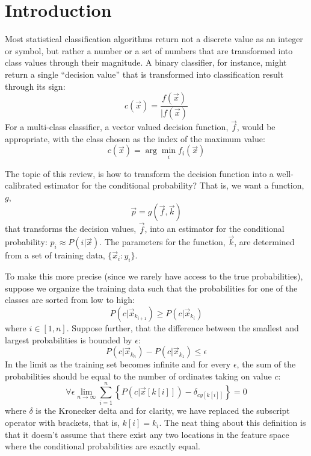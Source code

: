 \documentclass{article}
\newcommand{\classvalue}{c}
\newcommand{\binarydecision}{f}
\newcommand{\multidecision}{f}
\newcommand{\testpoint}{\vec x}
\newcommand{\transform}{g}
\newcommand{\param}{k}
\newcommand{\estimator}{{p}}
\newcommand{\condprob}{P}
\newcommand{\coord}{x}
\newcommand{\ord}{y}
\newcommand{\bound}{\epsilon}
\begin{document}
\section{Introduction}

Most statistical classification algorithms return not a discrete value as an 
integer or symbol, but rather a
number or a set of numbers that are transformed into class values through
their magnitude.
A binary classifier, for instance, might return a single ``decision value'' that
is transformed into classification result through its sign:
\begin{equation}
	\classvalue(\testpoint) = \frac{\binarydecision(\testpoint)}{|\binarydecision(\testpoint)}
\end{equation}
For a multi-class classifier, a vector valued decision function, 
$\vec \multidecision$, would be appropriate, with the class chosen as the
index of the maximum value:
\begin{equation}
	\classvalue(\testpoint) = \arg \min_i \multidecision_i (\vec x)
\end{equation}

The topic of this review, is how to transform the decision function into a
well-calibrated estimator for the conditional probability?
That is, we want a function, $\transform$,
\begin{equation}
  \vec \estimator = \transform(\vec \multidecision, \vec \param)
\end{equation}
that transforms the decision
values, $\vec \multidecision$, into an estimator for the conditional
probability: $\estimator_i \approx \condprob(i|\testpoint)$.
The parameters for the function, $\vec \param$, are determined from a set of 
training data, $\lbrace \vec \coord_i : \ord_i \rbrace$.

To make this more precise (since we rarely have access to the true
probabilities), suppose we organize the training data such that
the probabilities for one of the classes are sorted from low to high:
\begin{equation}
	\condprob(c | \vec \coord_{k_{i+1}}) \ge \condprob(c | \vec \coord_{k_i})
\end{equation}
where $i\in[1, n]$.
Suppose further, that the difference between the smallest and largest
probabilities is bounded by $\bound$:
\begin{equation}
	\condprob(c | \vec \coord_{k_n}) - \condprob (c | \vec \coord_{k_1}) \le \bound
\end{equation}
In the limit as the training set becomes infinite and for every $\bound$,
the sum of the probabilities should be equal to the number of ordinates taking
on value $c$:
\begin{equation}
	\forall \bound \lim_{n \rightarrow \infty} \sum_{i=1}^n \left \lbrace \condprob \left (c | \vec \coord[k[i]] \right ) - \delta_{c\ord[k[i]]} \right \rbrace = 0
	\label{calibrated_definition}
\end{equation}
where $\delta$ is the Kronecker delta and for clarity, we have replaced the
subscript operator with brackets, that is, $k[i]=k_i$.
The neat thing about this definition is that it doesn't assume that there
exist any two locations in the feature space where the conditional
probabilities are exactly equal.
\end{document}
